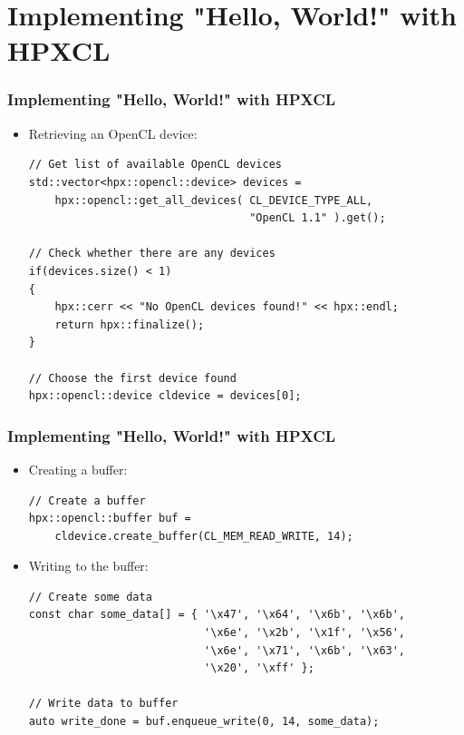 \documentclass{beamer}
\begin{document}
\section{Implementing "Hello, World!" with HPXCL}
\begin{frame}[fragile]
    \frametitle{Implementing "Hello, World!" with HPXCL}
    \begin{itemize}
        \item Retrieving an OpenCL device:
        \begin{lstlisting}[firstnumber=30]
// Get list of available OpenCL devices
std::vector<hpx::opencl::device> devices =
    hpx::opencl::get_all_devices( CL_DEVICE_TYPE_ALL,
                                  "OpenCL 1.1" ).get();

// Check whether there are any devices
if(devices.size() < 1)
{
    hpx::cerr << "No OpenCL devices found!" << hpx::endl;
    return hpx::finalize();
}

// Choose the first device found
hpx::opencl::device cldevice = devices[0];
        \end{lstlisting}
    \end{itemize}
\end{frame}

\begin{frame}[fragile]
    \frametitle{Implementing "Hello, World!" with HPXCL}
    \begin{itemize}
        \item Creating a buffer:
        \begin{lstlisting}[firstnumber=40]
// Create a buffer
hpx::opencl::buffer buf =
    cldevice.create_buffer(CL_MEM_READ_WRITE, 14);
        \end{lstlisting}
        \item Writing to the buffer:
        \begin{lstlisting}[firstnumber=44]
// Create some data
const char some_data[] = { '\x47', '\x64', '\x6b', '\x6b',
                           '\x6e', '\x2b', '\x1f', '\x56',
                           '\x6e', '\x71', '\x6b', '\x63',
                           '\x20', '\xff' };

// Write data to buffer
auto write_done = buf.enqueue_write(0, 14, some_data);
        \end{lstlisting}
    \end{itemize}
\end{frame}
\end{document}
